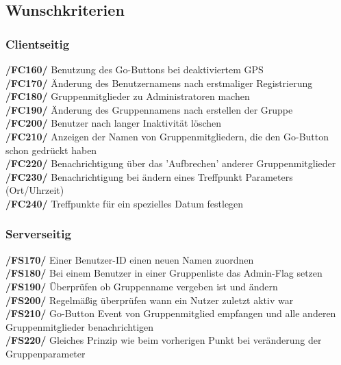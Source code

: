 \subsection{Wunschkriterien}
\subsubsection{Clientseitig}
     \textbf{/FC160/} Benutzung des Go-Buttons bei deaktiviertem GPS\\
     \textbf{/FC170/} Änderung des Benutzernamens nach erstmaliger Registrierung\\
     \textbf{/FC180/} Gruppenmitglieder zu Administratoren machen                \\
     \textbf{/FC190/} Änderung des Gruppennamens nach erstellen der Gruppe        \\
     \textbf{/FC200/} Benutzer nach langer Inaktivität löschen                     \\
     \textbf{/FC210/} Anzeigen der Namen von Gruppenmitgliedern, die den Go-Button schon gedrückt haben\\
     \textbf{/FC220/} Benachrichtigung über das 'Aufbrechen' anderer Gruppenmitglieder\\
     \textbf{/FC230/} Benachrichtigung bei ändern eines Treffpunkt Parameters (Ort/Uhrzeit)\\
     \textbf{/FC240/} Treffpunkte für ein spezielles Datum festlegen\\
\subsubsection{Serverseitig}
     \textbf{/FS170/} Einer Benutzer-ID einen neuen Namen zuordnen\\
     \textbf{/FS180/} Bei einem Benutzer in einer Gruppenliste das Admin-Flag setzen\\
     \textbf{/FS190/} Überprüfen ob Gruppenname vergeben ist und ändern\\
     \textbf{/FS200/} Regelmäßig überprüfen wann ein Nutzer zuletzt aktiv war\\
     \textbf{/FS210/} Go-Button Event von Gruppenmitglied empfangen und alle anderen Gruppenmitglieder benachrichtigen\\
     \textbf{/FS220/} Gleiches Prinzip wie beim vorherigen Punkt bei veränderung der Gruppenparameter\\
